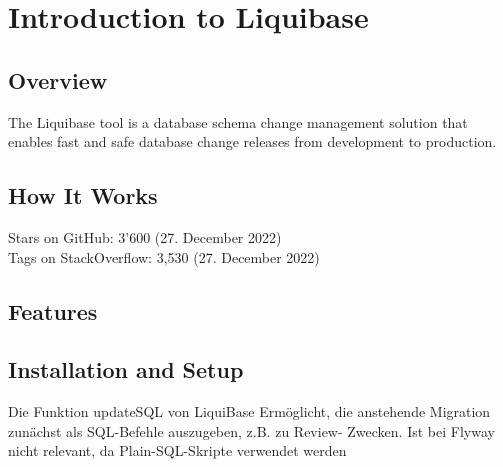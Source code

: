 

\chapter{Introduction to Liquibase}
\section{Overview}
The Liquibase tool is a database schema change management solution that enables fast and safe database change releases from development to production.

\section{How It Works}

%
Stars on GitHub: 3'600 (27. December 2022)\\
Tags on StackOverflow: 3,530 (27. December 2022)\\

\section{Features}



\section{Installation and Setup}
Die Funktion updateSQL von LiquiBase
Ermöglicht, die anstehende Migration zunächst als SQL-Befehle auszugeben, z.B. zu Review- Zwecken.
Ist bei Flyway nicht relevant, da Plain-SQL-Skripte verwendet werden


\newpage